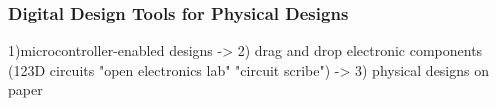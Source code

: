 \documentclass{sigchi}
\begin{document}
\subsubsection{Digital Design Tools for Physical Designs}

1)microcontroller-enabled designs -> 2) drag and drop electronic components (123D circuits "open electronics lab" "circuit scribe") -> 3) physical designs on paper







\end{document}
